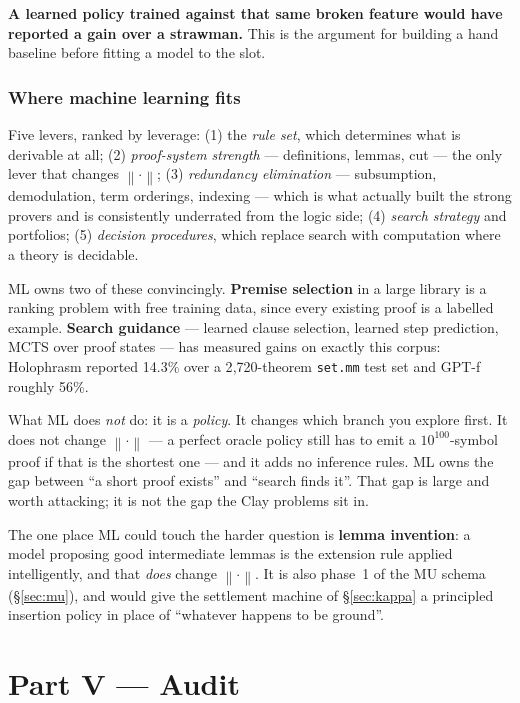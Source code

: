 \documentclass[11pt,a4paper]{article}
\newcommand{\shortest}[1]{\left\lVert #1 \right\rVert}
\begin{document}
\textbf{A learned policy trained against that same broken feature would have
reported a gain over a strawman.} This is the argument for building a hand
baseline before fitting a model to the slot.

\section{Where machine learning fits}

Five levers, ranked by leverage: (1) the \emph{rule set}, which determines what
is derivable at all; (2) \emph{proof-system strength} --- definitions, lemmas,
cut --- the only lever that changes $\shortest{\cdot}$; (3) \emph{redundancy
elimination} --- subsumption, demodulation, term orderings, indexing --- which is
what actually built the strong provers and is consistently underrated from the
logic side; (4) \emph{search strategy} and portfolios; (5) \emph{decision
procedures}, which replace search with computation where a theory is decidable.

ML owns two of these convincingly. \textbf{Premise selection} in a large
library is a ranking problem with free training data, since every existing
proof is a labelled example. \textbf{Search guidance} --- learned clause
selection, learned step prediction, MCTS over proof states --- has measured
gains on exactly this corpus: Holophrasm reported 14.3\% over a 2{,}720-theorem
\texttt{set.mm} test set and GPT-f roughly 56\%.

What ML does \emph{not} do: it is a \emph{policy}. It changes which branch you
explore first. It does not change $\shortest{\cdot}$ --- a perfect oracle policy
still has to emit a $10^{100}$-symbol proof if that is the shortest one --- and
it adds no inference rules. ML owns the gap between ``a short proof exists'' and
``search finds it''. That gap is large and worth attacking; it is not the gap
the Clay problems sit in.

The one place ML could touch the harder question is \textbf{lemma invention}: a
model proposing good intermediate lemmas is the extension rule applied
intelligently, and that \emph{does} change $\shortest{\cdot}$. It is also
phase~1 of the MU schema (\S\ref{sec:mu}), and would give the settlement machine
of \S\ref{sec:kappa} a principled insertion policy in place of ``whatever
happens to be ground''.

\part*{Part V --- Audit}
\end{document}
